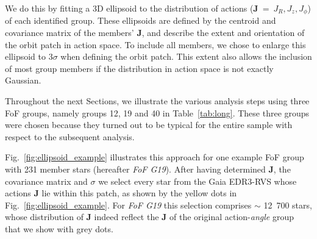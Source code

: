 \documentclass[twocolumn]{aastex631}
\begin{document}
We do this by fitting a 3D ellipsoid to the distribution of actions ($\mathbf{J}~=~J_{R}, J_{z}, J_{\phi}$) of each identified group. These ellipsoids are defined by the centroid and covariance matrix of the members' {\bf J}, and describe the extent and orientation of the orbit patch in action space. To include all members, we chose to enlarge this ellipsoid to 3$\sigma$ when defining the orbit patch. This extent also allows the inclusion of most group members if the distribution in action space is not exactly Gaussian.

Throughout the next Sections, we illustrate the various analysis steps using three FoF groups, namely groups 12, 19 and 40 in Table~\ref{tab:long}. These three groups were chosen because they turned out to be typical for the entire sample with respect to the subsequent analysis.

Fig.~\ref{fig:ellipsoid_example} illustrates this approach for one example FoF group with 231 member stars (hereafter \textit{FoF G19}). After having determined {\bf J}, the covariance matrix and $\sigma$ we select every star from the Gaia EDR3-RVS whose actions {\bf J} lie within this patch, as shown by the yellow dots in Fig.~\ref{fig:ellipsoid_example}. For \textit{FoF G19} this selection comprises $\sim$ 12\ 700 stars, whose distribution of {\bf J} indeed reflect the {\bf J} of the original action-\emph{angle} group that we show with grey dots. 
\end{document}
